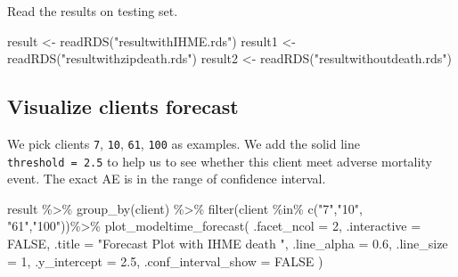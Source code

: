 \documentclass[
]{article}
\newenvironment{Shaded}{\begin{snugshade}}{\end{snugshade}}
\newcommand{\AttributeTok}[1]{\textcolor[rgb]{0.77,0.63,0.00}{#1}}
\newcommand{\ConstantTok}[1]{\textcolor[rgb]{0.00,0.00,0.00}{#1}}
\newcommand{\DecValTok}[1]{\textcolor[rgb]{0.00,0.00,0.81}{#1}}
\newcommand{\FloatTok}[1]{\textcolor[rgb]{0.00,0.00,0.81}{#1}}
\newcommand{\FunctionTok}[1]{\textcolor[rgb]{0.00,0.00,0.00}{#1}}
\newcommand{\NormalTok}[1]{#1}
\newcommand{\OtherTok}[1]{\textcolor[rgb]{0.56,0.35,0.01}{#1}}
\newcommand{\SpecialCharTok}[1]{\textcolor[rgb]{0.00,0.00,0.00}{#1}}
\newcommand{\StringTok}[1]{\textcolor[rgb]{0.31,0.60,0.02}{#1}}
\begin{document}
Read the results on testing set.

\begin{Shaded}
\begin{Highlighting}[]
\NormalTok{result }\OtherTok{\textless{}{-}} \FunctionTok{readRDS}\NormalTok{(}\StringTok{"resultwithIHME.rds"}\NormalTok{)}
\NormalTok{result1 }\OtherTok{\textless{}{-}} \FunctionTok{readRDS}\NormalTok{(}\StringTok{"resultwithzipdeath.rds"}\NormalTok{)}
\NormalTok{result2 }\OtherTok{\textless{}{-}} \FunctionTok{readRDS}\NormalTok{(}\StringTok{"resultwithoutdeath.rds"}\NormalTok{)}
\end{Highlighting}
\end{Shaded}

\hypertarget{visualize-clients-forecast}{%
\subsection{Visualize clients
forecast}\label{visualize-clients-forecast}}

We pick clients \texttt{7}, \texttt{10}, \texttt{61}, \texttt{100} as
examples. We add the solid line \texttt{threshold\ =\ 2.5} to help us to
see whether this client meet adverse mortality event. The exact AE is in
the range of confidence interval.

\begin{Shaded}
\begin{Highlighting}[]
\NormalTok{result }\SpecialCharTok{\%\textgreater{}\%}
    \FunctionTok{group\_by}\NormalTok{(client) }\SpecialCharTok{\%\textgreater{}\%}
    \FunctionTok{filter}\NormalTok{(client }\SpecialCharTok{\%in\%} \FunctionTok{c}\NormalTok{(}\StringTok{"7"}\NormalTok{,}\StringTok{"10"}\NormalTok{, }\StringTok{"61"}\NormalTok{,}\StringTok{"100"}\NormalTok{))}\SpecialCharTok{\%\textgreater{}\%}
    \FunctionTok{plot\_modeltime\_forecast}\NormalTok{(}
        \AttributeTok{.facet\_ncol  =} \DecValTok{2}\NormalTok{,}
        \AttributeTok{.interactive =} \ConstantTok{FALSE}\NormalTok{,}
        \AttributeTok{.title =} \StringTok{"Forecast Plot with IHME death "}\NormalTok{,}
        \AttributeTok{.line\_alpha =} \FloatTok{0.6}\NormalTok{,}
        \AttributeTok{.line\_size =} \DecValTok{1}\NormalTok{,}
        \AttributeTok{.y\_intercept =} \FloatTok{2.5}\NormalTok{,}
        \AttributeTok{.conf\_interval\_show =} \ConstantTok{FALSE}
\NormalTok{    )}
\end{Highlighting}
\end{Shaded}
\end{document}
